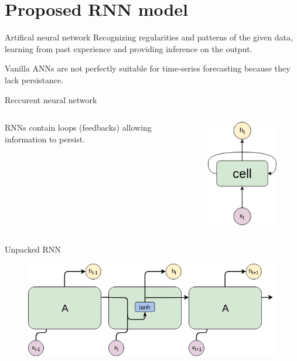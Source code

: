 \documentclass{beamer}
\begin{document}
  \section{Proposed RNN model}
  \begin{frame}{Artifical neural network}
    Recognizing regularities and patterns of the given data, learning from past experience and providing inference on the output.

    Vanilla ANNs are not perfectly suitable for time-series forecasting because they lack persistance.
  \end{frame}

  \begin{frame}{Reccurent neural network}
    \begin{columns}
        RNNs contain loops (feedbacks) allowing information to persist.
      \begin{figure}[]
        \centering
        \includegraphics[width=0.6\linewidth]{images/RNN.png}
      \end{figure}
    \end{columns}
  \end{frame}
  \begin{frame}{Unpacked RNN}
    \begin{figure}[]
      \centering
      \includegraphics[width=\linewidth]{images/RNN-unpacked.png}
    \end{figure}
  \end{frame}
\end{document}

